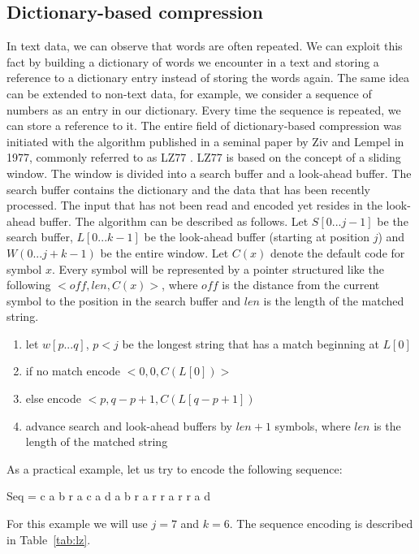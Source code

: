 \subsection*{Dictionary-based compression}
In text data, we can observe that words are often repeated. We can exploit this fact by
building a dictionary of words we encounter in a text and storing a reference to a dictionary
entry instead of storing the words again. The same idea can be extended to non-text data, for
example, we consider a sequence of numbers as an entry in our dictionary. Every time the
sequence is repeated, we can store a reference to it.
The entire field of dictionary-based compression was initiated with the algorithm published
in a seminal paper by Ziv and Lempel in 1977, commonly referred to as LZ77 \cite{ziv1977universal}.
LZ77 is based on the concept of a sliding window. The window is divided into a search buffer
and a look-ahead buffer. The search buffer contains the dictionary and the data that has been
recently processed. The input that has not been read and encoded yet resides in the look-ahead
buffer.
The algorithm can be described as follows. Let $S[0...j -1]$ be the search buffer, 
$L[0...k-1]$ be the look-ahead buffer (starting at position $j$) and $W(0...j+k-1)$
be the entire window. Let $C(x)$ denote the default code for symbol $x$.
Every symbol will be represented by a pointer structured like the following
$<off, len, C(x)>$, where $off$ is the distance from the current symbol to the
position in the search buffer and $len$ is the length of the matched string.
\begin{enumerate}
	\item let $w[p...q]$, $p < j$ be the longest string that has a match beginning at $L[0]$

	\item if no match encode $<0, 0, C(L[0])>$

	\item else encode $<p, q - p + 1, C(L[q - p + 1])$

	\item advance search and look-ahead buffers by $len + 1$ symbols, where $len$ is the length
    of the matched string
\end{enumerate}
As a practical example, let us try to encode the following sequence:
\begin{center}
Seq = c a b r a c a d a b r a r r a r r a d
\end{center}
For this example we will use $j=7$ and $k=6$. The sequence encoding is described in Table~\ref{tab:lz}.
